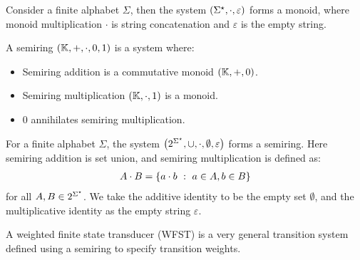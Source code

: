 \documentclass[12pt]{article}
\begin{document}
\begin{example}
  Consider a finite alphabet \(\Sigma\),
  then the system \(\left(\Sigma^{\star}, \cdot, \varepsilon\right)\)
  forms a monoid,
  where monoid multiplication \(\cdot\)
  is string concatenation and \(\varepsilon\) is the empty string.
\end{example}


\begin{definition}[Semiring]
  A semiring \(\left(\mathbb{K}, +, \cdot, 0, 1\right)\) is a system where:

  \begin{itemize}
    \item
      Semiring addition is a commutative monoid
      \(\left(\mathbb{K}, +, 0\right)\).

    \item
      Semiring multiplication
      \(\left(\mathbb{K}, \cdot, 1\right)\) is a monoid.

    \item
      \(0\) annihilates semiring multiplication.
  \end{itemize}

\end{definition}

\begin{example}
  For a finite alphabet \(\Sigma\),
  the system
  \(\left(2^{\Sigma^\star}, \cup, \cdot, \emptyset, \varepsilon\right)\)
  forms a semiring.
  Here semiring addition is set union,
  and semiring multiplication is defined as:
  \begin{align*}
    A \cdot B
      = \left\{a \cdot b \  : \  a \in A, b \in B\right\}
  \end{align*}
  for all \(A, B \in 2^{\Sigma^\star}\).
  We take
  the additive identity to be the empty set \(\emptyset\),
  and the multiplicative identity as the empty string \(\varepsilon\).
\end{example}

A weighted finite state transducer (WFST) is a very
general transition system defined
using a semiring to specify transition weights.
\end{document}

